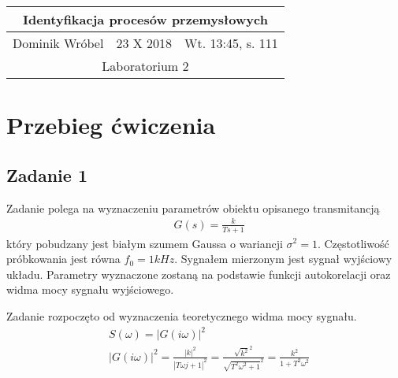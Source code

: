 \documentclass[a4paper,15pt]{article}
\begin{document}

\begin{table}
\begin{center}
\begin{tabular}{|l|l|l|}
\hline
\multicolumn{3}{|c|}{\textbf{Identyfikacja procesów przemysłowych}} \\ \hline Dominik Wróbel & 23 X 2018 & Wt. 13:45, s. 111 \\ \hline
\multicolumn{3}{|c|}{Laboratorium 2} \\ \hline 
\end{tabular}
\end{center}
\end{table}


\section{Przebieg ćwiczenia}
\subsection{Zadanie 1 }

Zadanie polega na wyznaczeniu parametrów obiektu opisanego transmitancją 
\begin{align*}
& G(s)=\frac{k}{Ts+1}
\end{align*}
który pobudzany jest białym szumem Gaussa o wariancji \( \sigma ^2 = 1 \). Częstotliwość próbkowania jest równa \( f_0 = 1kHz \). Sygnałem mierzonym jest sygnał wyjściowy układu. Parametry wyznaczone zostaną na podstawie funkcji autokorelacji oraz widma mocy sygnału wyjściowego. 

Zadanie rozpoczęto od wyznaczenia teoretycznego widma mocy sygnału. 
\begin{align*}
& S(\omega) = |G(i\omega)|^2 \\
& |G(i\omega)|^2 = \frac{|k|^2}{|T\omega j + 1|^2} = \frac{\sqrt{k^2}^2}{\sqrt{T^2\omega ^2 + 1}^2} = \frac{k^2}{1+T^2\omega ^2}
\end{align*}
\end{document}

